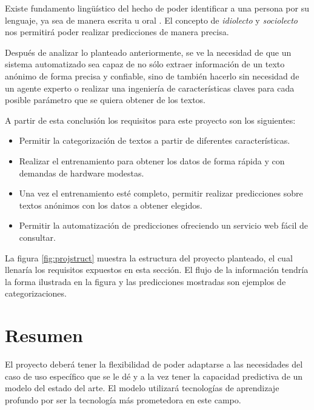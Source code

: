 Existe fundamento lingüístico del hecho de poder identificar a una persona por su lenguaje, ya sea de manera escrita u oral \parencite{coulthard2004author, louwerse2004semantic}. El concepto de \textit{\gls{idiolecto}} y \textit{\gls{sociolecto}} nos permitirá poder realizar predicciones de manera precisa.

Después de analizar lo planteado anteriormente, se ve la necesidad de que un sistema automatizado sea capaz de no sólo extraer información de un texto anónimo de forma precisa y confiable, sino de también hacerlo sin necesidad de un agente experto o realizar una ingeniería de características claves para cada posible parámetro que se quiera obtener de los textos.

A partir de esta conclusión los requisitos para este proyecto son los siguientes:

\begin{itemize}
\item Permitir la categorización de textos a partir de diferentes características.
\item Realizar el entrenamiento para obtener los datos de forma rápida y con demandas de hardware modestas.
\item Una vez el entrenamiento esté completo, permitir realizar predicciones sobre textos anónimos con los datos a obtener elegidos.
\item Permitir la automatización de predicciones ofreciendo un servicio web fácil de consultar.
\end{itemize}

La figura \ref{fig:projstruct} muestra la estructura del proyecto planteado, el cual llenaría los requisitos expuestos en esta sección. El flujo de la información tendría la forma ilustrada en la figura y las predicciones mostradas son ejemplos de categorizaciones.

\section{Resumen}

El proyecto deberá tener la flexibilidad de poder adaptarse a las necesidades del caso de uso específico que se le dé y a la vez tener la capacidad predictiva de un modelo del estado del arte. El modelo utilizará tecnologías de aprendizaje profundo por ser la tecnología más prometedora en este campo.





